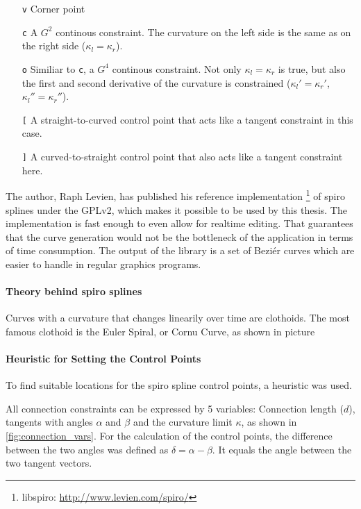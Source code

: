 \begin{itemize}
\item[\texttt{v}] Corner point
\item[\texttt{c}] A $G^2$ continous constraint. The curvature  on the left side is the same as on the right side ($\kappa_l = \kappa_r$).
\item[\texttt{o}] Similiar to \texttt{c}, a $G^4$ continous constraint. Not only $\kappa_l = \kappa_r$ is true, but also the first and second derivative of the curvature is constrained ($\kappa_l' = \kappa_r'$, $\kappa_l'' = \kappa_r''$).
\item[\texttt{[}] A straight-to-curved control point that acts like a tangent constraint in this case.
\item[\texttt{]}] A curved-to-straight control point that also acts like a tangent constraint here.
\end{itemize}

The author, Raph Levien, has published his reference implementation \footnote{libspiro: \url{http://www.levien.com/spiro/}} of spiro splines under the GPLv2, which makes it possible to be used by this thesis. The implementation is fast enough to even allow for realtime editing. That guarantees that the curve generation would not be the bottleneck of the application in terms of time consumption. The output of the library is a set of Beziér curves which are easier to handle in regular graphics programs.

\paragraph{Theory behind spiro splines}

Curves with a curvature that changes linearily over time are clothoids. The most famous clothoid is the Euler Spiral, or Cornu Curve, as shown in picture 

\paragraph{Heuristic for Setting the Control Points}

To find suitable locations for the spiro spline control points, a heuristic was used.

All connection constraints can be expressed by 5 variables: Connection length ($d$), tangents with angles $\alpha$ and $\beta$ and the curvature limit $\kappa$, as shown in \autoref{fig:connection_vars}. For the calculation of the control points, the difference between the two angles was defined as $\delta = \alpha - \beta$. It equals the angle between the two tangent vectors. 

